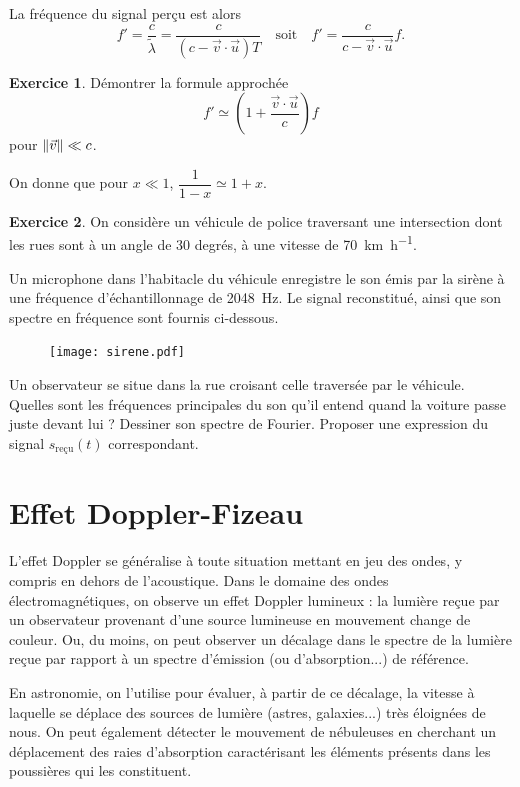 \documentclass{article}
\DeclarePairedDelimiter{\norm}{\lVert}{\rVert}
\theoremstyle{definition}
\newtheorem{exo}{Exercice}
\begin{document}
La fréquence du signal perçu est alors
\begin{equation}
	f' = \frac{c}{\tilde{\lambda}} = \frac{c}{(c-\vec v \cdot \vec u)T}\quad\text{soit}\quad
	\boxed{f' = \frac{c}{c-\vec v\cdot\vec u}f.}
\end{equation}

\begin{exo}
	Démontrer la formule approchée
	\begin{equation}
		f' \simeq \left(1+\frac{\vec v\cdot \vec u}{c}\right)f
	\end{equation}
	pour $\norm{\vec v}\ll c$.
	
	On donne que pour $x\ll 1$, $\dfrac{1}{1-x}\simeq 1+x$.
\end{exo}

\begin{exo}
	On considère un véhicule de police traversant une intersection dont les rues sont à un angle de 30 degrés, à une vitesse de \SI{70}{\kilo\meter\per\hour}.
	 	
	Un microphone dans l'habitacle du véhicule enregistre le son émis par la sirène à une fréquence d'échantillonnage de \SI{2048}{\hertz}. Le signal reconstitué, ainsi que son spectre en fréquence sont fournis ci-dessous.
	
	\begin{figure}[h]
		\texttt{[image: sirene.pdf]}
	\end{figure}
	
	Un observateur se situe dans la rue croisant celle traversée par le véhicule. Quelles sont les fréquences principales du son qu'il entend quand la voiture passe juste devant lui ? Dessiner son spectre de Fourier. Proposer une expression du signal $s_\mathrm{reçu}(t)$ correspondant.
\end{exo}

\section{Effet Doppler-Fizeau}

L'effet Doppler se généralise à toute situation mettant en jeu des ondes, y compris en dehors de l'acoustique. Dans le domaine des ondes électromagnétiques, on observe un effet Doppler lumineux : la lumière reçue par un observateur provenant d'une source lumineuse en mouvement change de couleur. Ou, du moins, on peut observer un décalage dans le spectre de la lumière reçue par rapport à un spectre d'émission (ou d'absorption...) de référence.

En astronomie, on l'utilise pour évaluer, à partir de ce décalage, la vitesse à laquelle se déplace des sources de lumière (astres, galaxies...) très éloignées de nous. On peut également détecter le mouvement de nébuleuses en cherchant un déplacement des raies d'absorption caractérisant les éléments présents dans les poussières qui les constituent.
\end{document}
